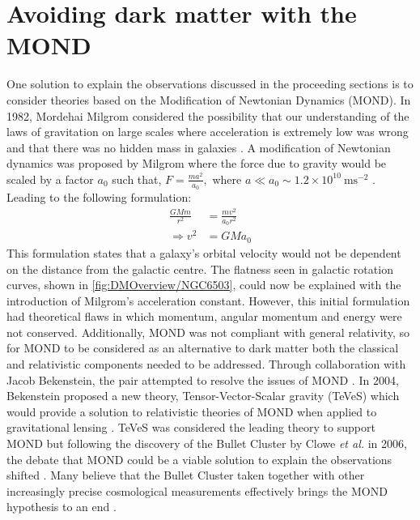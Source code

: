 \section{Avoiding dark matter with the MOND}\label{sec:DMOverview/AvoidDM}
One solution to explain the observations discussed in the proceeding sections is to consider theories based on the Modification of Newtonian Dynamics (MOND). In 1982, Mordehai Milgrom considered the possibility that our understanding of the laws of gravitation on large scales where acceleration is extremely low was wrong and that there was no hidden mass in galaxies \cite{MOND}. A modification of Newtonian dynamics was proposed by Milgrom where the force due to gravity would be scaled by a factor $a_0$ such that, $F=\frac{ma^2}{a_0},$ where $a\ll a_0\sim 1.2\times10^{10}~\text{ms}^{-2}$ \cite{HistoryofDM}. Leading to the following formulation:
\begin{equation}
\begin{split}
    \frac{GMm}{r^2}&=\frac{mv^2}{a_0r^2}\\
    \Rightarrow v^2&=GMa_0
\end{split}
\end{equation}
This formulation states that a galaxy's orbital velocity would not be dependent on the distance from the galactic centre. The flatness seen in galactic rotation curves, shown in \autoref{fig:DMOverview/NGC6503}, could now be explained with the introduction of Milgrom's acceleration constant. However, this initial formulation had theoretical flaws in which momentum, angular momentum and energy were not conserved. Additionally, MOND was not compliant with general relativity, so for MOND to be considered as an alternative to dark matter both the classical and relativistic components needed to be addressed.
Through collaboration with Jacob Bekenstein, the pair attempted to resolve the issues of MOND \cite{Bekenstein1984}. In 2004, Bekenstein proposed a new theory, Tensor-Vector-Scalar
gravity (TeVeS) which would provide a solution to relativistic theories of MOND when applied to gravitational lensing \cite{TeVeS}. TeVeS was considered the leading theory to support MOND but following the discovery of the Bullet Cluster by Clowe \textit{et al.} in 2006, the debate that MOND could be a viable solution to explain the observations shifted \cite{Clowe2006}. Many believe that the Bullet Cluster taken together with other increasingly precise cosmological measurements effectively brings the MOND hypothesis to an end \cite{HistoryofDM}.
